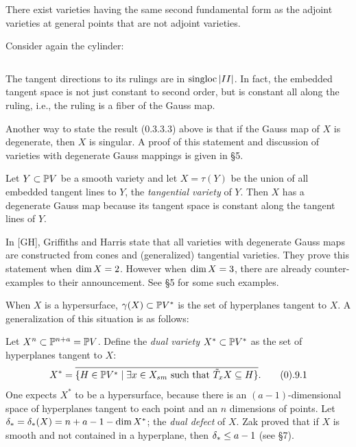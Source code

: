  There exist varieties
having the same second fundamental form as the adjoint varieties
at general points that  are not  adjoint varieties.\endproclaim


  
\smallpagebreak


Consider again the cylinder:

$$
\ 
$$

The tangent directions to its rulings  are in $\text{singloc}\,| II |$.
 In fact, the embedded tangent space is not
just constant to second order, but is constant all along the ruling, i.e.,
the ruling is a fiber of the   Gauss map.

  Another way to state
the result (0.3.3.3)   above is that   if  the  Gauss map of $X$
is degenerate, then $X$ is singular. A proof of this
statement and discussion of  varieties with degenerate Gauss mappings
is given in \S 5.

 Let $Y\subset\Bbb P V$ be a smooth variety and let $X=\tau (Y)$ be the
union of all embedded tangent lines to $Y$,
the {\it tangential variety} of $Y$. Then $X$ has a degenerate
Gauss map because its tangent space is constant along the tangent
lines of $Y$.

In [GH], Griffiths and Harris state that all varieties with degenerate
Gauss maps are constructed from cones and (generalized) tangential
varieties. They prove this statement when $\text{dim}\, X=2$. However
when $\text{dim}\, X=3$, there are already counter-examples to their announcement.
See \S 5 for some such examples.
 
 


When $X$ is a hypersurface,   $\gamma (X)\subset\Bbb P V^*$ is the set
of hyperplanes tangent to $X$. A generalization  of this 
situation is as follows:

Let $X^n\subset\Bbb P^{n+a}=\Bbb P V$. Define the
{\it dual variety} $X^*\subset\Bbb P V^*$ as the set of  hyperplanes tangent
to
$X$:
$$
X^*=\overline {\{ H\in \ppp V^*\mid \exists x\in \xsm\text{ such that
}
\tilde T_xX\subseteq H\} }.\tag 0.9.1 
$$
 One expects $X^*$ to be a hypersurface,
because there is an $(a-1)$-dimensional space of hyperplanes
tangent to each point and an $n$ dimensions   of points.
Let $\delta_{*} = \delta_{*} (X) = n+a-1-\text{dim}\, X^*$; the {\it dual defect} of $X$.
 Zak proved that if $X$ is smooth and
not contained in a hyperplane, then $\delta_{*}\leq a-1$ (see \S 7).


